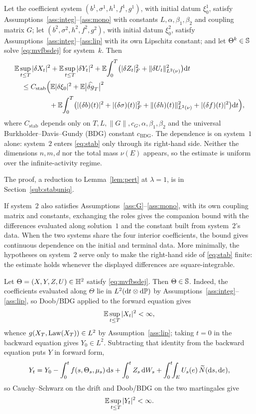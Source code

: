\begin{theorem}\label{thm:stab}
Let the coefficient system $(b^1,\sigma^1,h^1,f^1,g^1)$, with initial datum $\xi_0^1$,
satisfy Assumptions~\ref{ass:integ}--\ref{ass:mono} with constants $L,\alpha,\beta_1,\beta_2$
and coupling matrix $G$; let $(b^2,\sigma^2,h^2,f^2,g^2)$, with initial datum $\xi_0^2$,
satisfy Assumptions~\ref{ass:integ}--\ref{ass:lip} with its own Lipschitz constant; and let
$\Theta^k\in\mathbb{S}$ solve \eqref{eq:mvfbsdej} for system~$k$. Then
\begin{equation}\label{eq:stab}
\begin{split}
&\mathbb{E}\sup_{t\le T}|\delta X_t|^2+\mathbb{E}\sup_{t\le T}|\delta Y_t|^2
+\mathbb{E}\!\int_0^T\!\big(|\delta Z_t|_F^2+\lVert \delta U_t\rVert_{L^2(\nu)}^2\big)\mathrm{d} t\\
&\quad\le C_{\mathrm{stab}}\Big(\mathbb{E}|\delta\xi_0|^2+\mathbb{E}\big|\widehat{\delta g}_T\big|^2\\
&\qquad\qquad\quad+\mathbb{E}\!\int_0^T\!\big(|(\delta b)(t)|^2+|(\delta\sigma)(t)|_F^2
+\lVert (\delta h)(t)\rVert_{L^2(\nu)}^2+|(\delta f)(t)|^2\big)\mathrm{d} t\Big),
\end{split}
\end{equation}
where $C_{\mathrm{stab}}$ depends only on $T,L,\|G\|,c_G,\alpha,\beta_1,\beta_2$ and the universal
Burkholder--Davis--Gundy (BDG) constant $c_{\mathrm{BDG}}$. The dependence is on
system~$1$ alone: system~$2$ enters \eqref{eq:stab} only through its right-hand side.
Neither the dimensions $n,m,d$ nor the total mass $\nu(E)$ appears, so the estimate is
uniform over the infinite-activity regime.
\end{theorem}
\noindent The proof, a reduction to Lemma~\ref{lem:pert} at $\lambda=1$, is in
Section~\ref{sub:stabuniq}.

\noindent If system~$2$ also satisfies Assumptions~\ref{ass:G}--\ref{ass:mono}, with its
own coupling matrix and constants, exchanging the roles gives the companion bound with the
differences evaluated along solution~$1$ and the constant built from system~$2$'s data.
When the two systems share the four interior coefficients, the bound gives continuous
dependence on the initial and terminal data. More minimally, the hypotheses on system~$2$
serve only to make the right-hand side of \eqref{eq:stab} finite: the estimate holds
whenever the displayed differences are square-integrable.

\begin{remark}\label{rem:cwp-class}
Let $\Theta=(X,Y,Z,U)\in\mathbb{H}^2$ satisfy \eqref{eq:mvfbsdej}. Then $\Theta\in\mathbb{S}$. Indeed, the coefficients evaluated along $\Theta$ lie in
$L^2(\mathrm{d} t\otimes\mathrm{d}\mathbb{P})$ by Assumptions~\ref{ass:integ}--\ref{ass:lip}, so Doob/BDG
applied to the forward equation gives
\[
\mathbb{E}\sup_{t\le T}|X_t|^2<\infty ,
\]
whence $g(X_T,\mathrm{Law}(X_T))\in L^2$ by Assumption~\ref{ass:lip}; taking $t=0$ in the backward
equation gives $Y_0\in L^2$. Subtracting that identity from the backward
equation puts $Y$ in forward form,
\[
Y_t=Y_0-\int_0^t f(s,\Theta_s,\mu_s)\,\mathrm{d} s+\int_0^t Z_s\,\mathrm{d} W_s
+\int_0^t\!\!\int_E U_s(e)\,\widetilde{N}(\mathrm{d} s,\mathrm{d} e),
\]
so Cauchy--Schwarz on the drift and Doob/BDG on the two martingales give
\[
\mathbb{E}\sup_{t\le T}|Y_t|^2<\infty .
\]
\end{remark}

